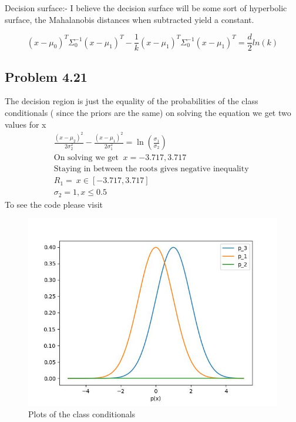 Decision surface:- I believe the decision surface will be some sort of hyperbolic surface, the Mahalanobis distances when subtracted yield a  constant.

\begin{equation}
    (x - \mu_0)^T\Sigma_0^{-1}(x - \mu_1)^T - \frac{1}{k}(x - \mu_1)^T\Sigma_0^{-1}(x - \mu_1)^T =\frac{d}{2}ln(k)
\end{equation}

\subsection{Problem 4.21}
The decision region is just the equality of the probabilities of the class conditionals ( since the priors are the same)
on solving the equation we get two values for x 
\begin{gather}
    \frac{(x - \mu_2)^2}{2 \sigma_2^2} - \frac{(x - \mu_1)^2}{2 \sigma_1^2} = \ln(\frac{\sigma_1}{\sigma_2}) \\
    \text{On solving we get } \ x = -3.717 , 3.717
    \\ 
    \text{Staying in between the roots gives negative inequality  } 
    \\R_1 = \ x \in [-3.717, 3.717] 
    \\
    \sigma_2 = 1 , x \le 0.5
\end{gather}
To see the code please visit \cite{CS3390}
\begin{figure}[!h]
    \centering
    \includegraphics[scale = 0.5]{Murphy-4.21.jpg}
    \caption{Plots of the class conditionals}
\end{figure}


